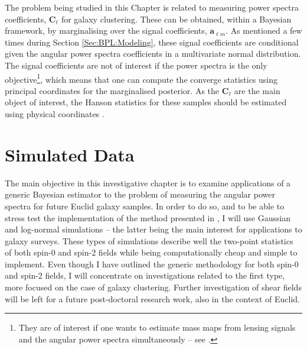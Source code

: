 \qquad The problem being studied in this Chapter is related to measuring power spectra coefficients, $\bm{C}_{\ell}$ for galaxy clustering. These can be obtained, within a Bayesian framework, by marginalising over the signal coefficients, $\bm{a}_{\ell m}$. As mentioned a few times during Section \ref{Sec:BPL:Modeling}, these signal coefficients are conditional given the angular power spectra coefficients in a multivariate normal distribution. The signal coefficients are not of interest if the power spectra is the only objective\footnote{They are of interest if one wants to estimate mass maps from lensing signals and the angular power spectra simultaneously -- see \cite{AlmostBlackPearl2016}.}, which means that one can compute the converge statistics using principal coordinates for the marginalised posterior. As the $\bm{C}_{\ell}$ are the main object of interest, the Hanson statistics for these samples should be estimated using physical coordinates \citep{SreeThesis}. 


\section{Simulated Data}\label{Sec:BPL:SimData}
The main objective in this investigative chapter is to examine applications of a generic Bayesian estimator to the problem of measuring the angular power spectra for future Euclid galaxy samples. In order to do so, and to be able to stress test the implementation of the method presented in \cite{SreeThesis}, I will use Gaussian and log-normal simulations -- the latter being the main interest for applications to galaxy surveys. These types of simulations describe well the two-point statistics of both spin-0 and spin-2 fields while being computationally cheap and simple to implement. Even though I have outlined the generic methodology for both spin-0 and spin-2 fields, I will concentrate on investigations related to the first type, more focused on the case of galaxy clustering. Further investigation of shear fields will be left for a future post-doctoral research work, also in the context of Euclid.

